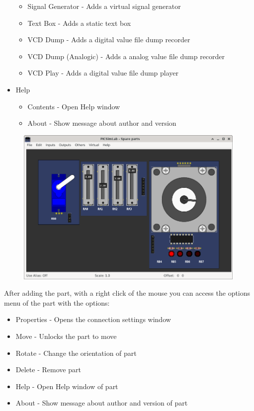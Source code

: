 \begin{itemize}
\begin{itemize}
  \item Signal Generator - Adds a virtual signal generator
  \item Text Box - Adds a static text box
  \item VCD Dump - Adds a digital value file dump recorder 
  \item VCD Dump (Analogic) - Adds a analog value file dump recorder  
  \item VCD Play - Adds a digital value file dump player  
  \end{itemize}   
 \item Help
 \begin{itemize}
 \item Contents - Open Help window
 \item About - Show message about author and version
\end{itemize}
\end{itemize}


\begin{figure}[H]
\center
\includegraphics[width=0.99\textwidth]{img/spare.png} 
\end{figure} 

After adding the part, with a right click of the mouse you can access the options menu of the part with the options:
\begin{itemize}
 \item Properties - Opens the connection settings window
 \item Move - Unlocks the part to move
 \item Rotate - Change the orientation of part
 \item Delete - Remove part
 \item Help - Open Help window of part
 \item About - Show message about author and version of part
\end{itemize}


